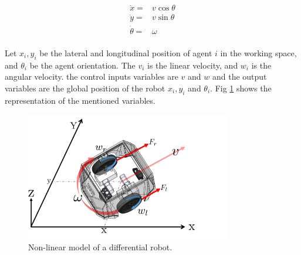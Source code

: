     


\begin{equation}
\begin{split}
\label{eq:nonlinear_model}
\dot{x} =& v \cos{\theta}\\ 
\dot{y} =& v \sin{\theta} \\
\dot{\theta} =& \omega  \\ 
\end{split}
\end{equation}

Let $x_i, y_i$ be the lateral and longitudinal position of agent $i$ in the working space, and $\theta_i$ be the agent orientation. The $v_i$ is the linear velocity, and $w_i$ is the angular velocity. the control inputs variables are $v$ and $w$ and the output variables are the global position of the robot $x_i, y_i$ and $\theta_i$. Fig \ref{kinematic2} shows the representation of the mentioned variables.\


\begin{figure}[h!]
\centering
    \includegraphics[width=0.8\textwidth]{Kap3/kinematic.png}
    \caption{Non-linear model of a differential robot.}
    \label{kinematic2}
\end{figure}




